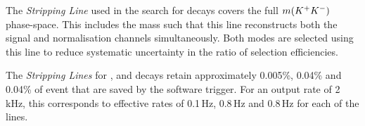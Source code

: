 The \emph{Stripping Line} used in the search for \decay{\Bp}{\Dsp\Kp\Km} decays covers the full $m({{K}^+}{{K}^-})$ phase-space. This includes the \Dzb mass such that this line reconstructs both the signal and normalisation channels simultaneously. 
Both modes are selected using this line to reduce systematic uncertainty in the ratio of selection efficiencies.

The \emph{Stripping Lines} for \decay{\Bp}{\Dsp\phiz}, \decay{\Bp}{\Dsp\Dzb} and \decay{\Bp}{\Dsp\Kp\Km} decays retain approximately 0.005\%, 0.04\% and 0.04\% of event that are saved by the software trigger. For an \hlttwo output rate of 2\,kHz, this corresponds to effective rates of 0.1\,Hz, 0.8\,Hz and 0.8\,Hz for each of the lines.



